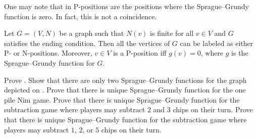One may note that in  P-positions are the positions
where the Sprague--Grundy function is zero. In fact, this is not a coincidence.
\begin{theorem}
\label{theorem:grundy-to-np}
  Let $G = (V, N)$ be a graph such that $N(v)$ is finite for all $v \in V$ and 
  $G$ satisfies the ending condition. Then all the vertices of $G$ can be
  labeled as either P- or N-positions. Moreover, $v \in V$ is a P-position iff
  $g(v) = 0$, where $g$ is the Sprague--Grundy function for $G$.
\end{theorem}


\begin{chapterendexercises}
    \exercise Prove .
    \exercise Show that there are only two Sprague--Grundy functions for the
      graph depicted on .
    \exercise Prove that there is unique Sprague--Grundy function for the one pile
        Nim game.
    \exercise Prove that there is unique Sprague--Grundy function for the
        subtraction game where players may subtract $2$ and $3$ chips on their
        turn.
    \exercise
       Prove that there is unique Sprague--Grundy function for the subtraction
       game where players may subtract $1$, $2$, or $5$ chips
       on their turn.
\end{chapterendexercises}
